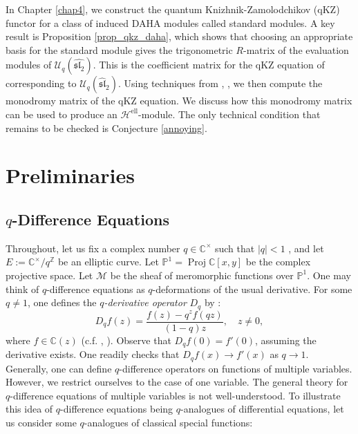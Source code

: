 \documentclass[a4paper]{report}
\theoremstyle{theorem}
\theoremstyle{definition}
\theoremstyle{remark}
\theoremstyle{proposition}
\theoremstyle{conjecture}
\theoremstyle{lemma}
\theoremstyle{corollary}
\theoremstyle{exercise}
\theoremstyle{example}
\newcommand{\C}{\mathbb{C}}
\newcommand{\mcal}{\mathcal}
\newcommand{\on}{\operatorname}
\begin{document}
  In Chapter \ref{chap4}, we construct the
  quantum Knizhnik-Zamolodchikov (qKZ) functor for a class of induced DAHA modules called standard modules. A key result is Proposition \ref{prop_qkz_daha}, which shows 
  that choosing an appropriate basis for the standard module gives the trigonometric $R$-matrix of the evaluation modules 
  of $\mcal{U}_q(\widehat{\mathfrak{sl}_2})$. This is the 
  coefficient matrix for the qKZ equation of \cite{fr92} corresponding to $\mcal{U}_q(\widehat{\mathfrak{sl}}_2)$. 
  Using techniques from \cite{efk98}, \cite{sauloy03}, we then compute the monodromy matrix of the qKZ equation. 
  We discuss how this monodromy matrix can be used to produce an $\mcal{H}^{\on{ell}}$-module. The only technical condition 
  that remains to be checked is Conjecture \ref{annoying}.
  
  \chapter{Preliminaries}\label{chap1}
  \section{$q$-Difference Equations}\label{sec_qdiff}
  
  Throughout, let us fix a complex number $q\in \C^\times$ such that 
  $\vert q\vert < 1$ , and let $E := \C^\times /q^{\mathbb{Z}}$ be an 
  elliptic curve. Let $\mathbb{P}^1 = \on{Proj}\C[x,y]$ be the complex projective
  space. Let $\mcal{M}$ be the sheaf of meromorphic functions over $\mathbb{P}^1$.
  One may think of $q$-difference equations 
  as $q$-deformations of the usual derivative. For some $q\neq 1$, 
  one defines the \emph{$q$-derivative operator} $D_q$ by \cite[\S 3.1]{koe18}:
  $$D_qf(z) = \frac{f(z) - q^zf(qz)}{(1-q)z},\quad z\neq 0,$$
  where $f\in \C(z)$ (c.f. \cite[(1.16)]{am10}, \cite{koe18}).
  Observe that $D_qf(0) = f'(0)$, assuming the derivative exists. One readily checks that
  $D_qf(x) \to f'(x)$ as $q\to 1$. 
  Generally, one can define $q$-difference 
  operators on functions of multiple variables. However, we restrict ourselves to the case 
  of one variable. The general theory for $q$-difference equations 
  of multiple variables is not well-understood. 
  To illustrate this idea of $q$-difference equations being $q$-analogues of differential equations, 
  let us consider some $q$-analogues of classical special functions:
  
\end{document}
